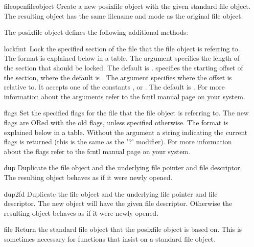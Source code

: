 \begin{funcdesc}{fileopen}{fileobject}
 Create a new posixfile object with the given standard file object.
 The resulting object has the same filename and mode as the original
 file object.
\end{funcdesc}

The posixfile object defines the following additional methods:

\renewcommand{\indexsubitem}{(posixfile method)}
\begin{funcdesc}{lock}{fmt\, }
 Lock the specified section of the file that the file object is
 referring to.  The format is explained
 below in a table.  The  argument specifies the length of the
 section that should be locked. The default is . 
 specifies the starting offset of the section, where the default is
 .  The  argument specifies where the offset is
 relative to. It accepts one of the constants ,
  or .  The default is .
 For more information about the arguments refer to the fcntl
 manual page on your system.
\end{funcdesc}

\begin{funcdesc}{flags}{}
 Set the specified flags for the file that the file object is referring
 to.  The new flags are ORed with the old flags, unless specified
 otherwise.  The format is explained below in a table.  Without
 the  argument
 a string indicating the current flags is returned (this is
 the same as the '?' modifier).  For more information about the flags
 refer to the fcntl manual page on your system.
\end{funcdesc}

\begin{funcdesc}{dup}{}
 Duplicate the file object and the underlying file pointer and file
 descriptor.  The resulting object behaves as if it were newly
 opened.
\end{funcdesc}

\begin{funcdesc}{dup2}{fd}
 Duplicate the file object and the underlying file pointer and file
 descriptor.  The new object will have the given file descriptor.
 Otherwise the resulting object behaves as if it were newly opened.
\end{funcdesc}

\begin{funcdesc}{file}{}
 Return the standard file object that the posixfile object is based
 on.  This is sometimes necessary for functions that insist on a
 standard file object.
\end{funcdesc}

